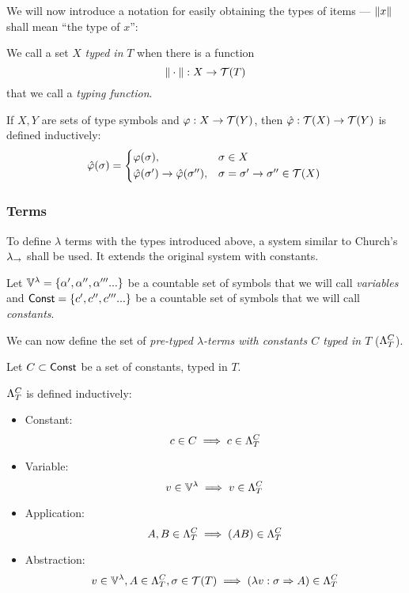\documentclass[main.tex]{subfiles}
\begin{document}
We will now introduce a notation for easily obtaining the types of items ---
$\typeof{x}$ shall mean ``the type of $x$'':

\begin{defn}
    We call a set $X$ \emph{typed in} $T$ when there is a function
    \[ \typeoff : X \fun \tclos{T} \]
    that we call a \emph{typing function}.
\end{defn}

\begin{defn}
    If $X, Y$ are sets of type symbols and $\varphi: X \fun \tclos{Y}$,
    then $\hat{\varphi} : \tclos{X} \fun \tclos{Y}$ is defined inductively:
    \begin{equation*}
        \hat{\varphi}(\sigma) =
        \begin{cases*}
            \varphi(\sigma) ,& $\sigma \in X$ \\
            \hat{\varphi}(\sigma') \tot \hat{\varphi}(\sigma'') ,&
                $\sigma = \sigma' \tot \sigma'' \in \tclos{X}$ \\
        \end{cases*}
    \end{equation*}
\end{defn}

\subsubsection{Terms}
To define $\lambda$ terms with the types introduced above, a system similar
to Church's $\lambda_\tot$ \cite[chap.~2.4]{ttfp} shall be used. It
extends the original system with constants.

Let $\lvars = \{ \alpha', \alpha'', \alpha''' ... \}$ be a countable set of symbols
that we will call \emph{variables} and $\const = \{ c', c'', c''' ... \}$ be a countable
set of symbols that we will call \emph{constants}.

We can now define the set of
\emph{pre-typed $\lambda$-terms with constants $C$ typed in $T$} ($\plambda{T}{C}$).

\begin{defn}
    \label{def:lambdaterm}
    Let $C \subset \const$ be a set of constants, typed in $T$.

    $\plambda{T}{C}$ is defined inductively:
    \begin{itemize}
        \item Constant:    \[ c \in C \implies c \in \plambda{T}{C} \]
        \item Variable:    \[ v \in \lvars \implies v \in \plambda{T}{C} \]
        \item Application: \[ A, B \in \plambda{T}{C} \implies (AB) \in \plambda{T}{C} \]
        \item Abstraction: \[ v \in \lvars, A \in \plambda{T}{C}, \sigma \in \tclos{T}
                \implies (\lambda v : \sigma \abstr A) \in \plambda{T}{C} \]
    \end{itemize}
\end{defn}
\end{document}
